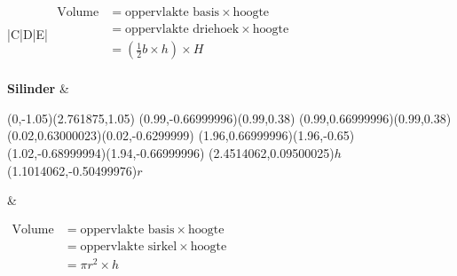 \begin{table*}[h]
\begin{tabular}{|C|D|E|}
$\begin{aligned}
\mbox{Volume} &= \mbox{oppervlakte basis} \times \mbox{hoogte} \\
                &= \mbox{oppervlakte driehoek} \times \mbox{hoogte} \\
                &=\left(\frac{1}{2}b\times h\right) \times H \\
\end{aligned}$  \\ \hline

\textbf{Silinder} &
\begin{center}
\scalebox{1} %
{
\begin{pspicture}(0,-1.05)(2.761875,1.05)
\psellipse[linewidth=0.04,dimen=outer](0.99,-0.66999996)(0.99,0.38)
\psellipse[linewidth=0.04,dimen=outer](0.99,0.66999996)(0.99,0.38)
\psline[linewidth=0.04cm](0.02,0.63000023)(0.02,-0.6299999)
\psline[linewidth=0.04cm](1.96,0.66999996)(1.96,-0.65)
\psline[linewidth=0.04cm,linestyle=dashed,dash=0.16cm 0.16cm](1.02,-0.68999994)(1.94,-0.66999996)
\rput(2.4514062,0.09500025){$h$}
\rput(1.1014062,-0.50499976){$r$}
\end{pspicture} 
}
\end{center}
&

$\begin{aligned}
\mbox{Volume} &= \mbox{oppervlakte basis} \times \mbox{hoogte} \\
                &= \mbox{oppervlakte sirkel} \times \mbox{hoogte} \\
                &= \pi r^2 \times h \\
\end{aligned}$  \\ \hline



\end{tabular}
\end{table*}






